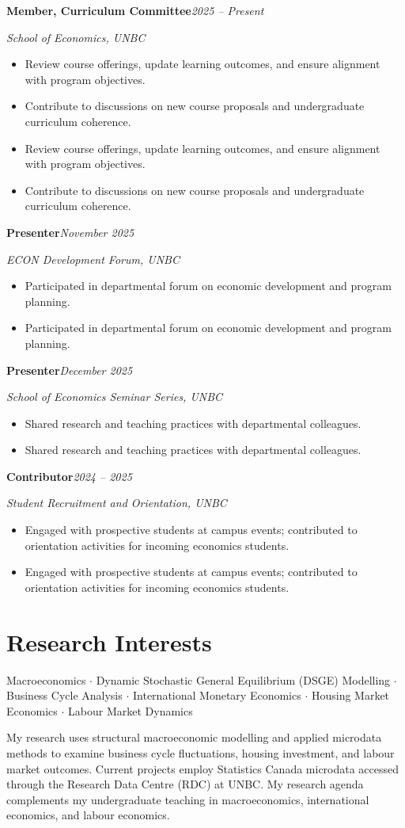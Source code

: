 \documentclass[11pt,letterpaper]{article}
\newcommand{\cventry}[4]{%
  \noindent\textbf{#2}\hfill\textit{\small #1}\par
  \noindent\textit{#3}\par
  \ifx\relax#4\relax\else
    \vspace{1pt}%
    #4%
  \fi
  \vspace{5pt}%
}
\begin{document}
\cventry{2025 -- Present}{Member, Curriculum Committee}{School of Economics, UNBC}{%
  \begin{itemize}
    \item Review course offerings, update learning outcomes, and ensure alignment with program objectives.
    \item Contribute to discussions on new course proposals and undergraduate curriculum coherence.
  \end{itemize}
}

\cventry{November 2025}{Presenter}{ECON Development Forum, UNBC}{%
  \begin{itemize}
    \item Participated in departmental forum on economic development and program planning.
  \end{itemize}
}

\cventry{December 2025}{Presenter}{School of Economics Seminar Series, UNBC}{%
  \begin{itemize}
    \item Shared research and teaching practices with departmental colleagues.
  \end{itemize}
}

\cventry{2024 -- 2025}{Contributor}{Student Recruitment and Orientation, UNBC}{%
  \begin{itemize}
    \item Engaged with prospective students at campus events; contributed to orientation activities for incoming economics students.
  \end{itemize}
}

\section{Research Interests}

Macroeconomics $\cdot$ Dynamic Stochastic General Equilibrium (DSGE) Modelling $\cdot$ Business Cycle Analysis $\cdot$ International Monetary Economics $\cdot$ Housing Market Economics $\cdot$ Labour Market Dynamics

My research uses structural macroeconomic modelling and applied microdata methods to examine business cycle fluctuations, housing investment, and labour market outcomes. Current projects employ Statistics Canada microdata accessed through the Research Data Centre (RDC) at UNBC. My research agenda complements my undergraduate teaching in macroeconomics, international economics, and labour economics.
\end{document}

